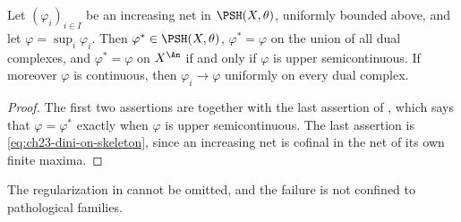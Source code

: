\begin{corollary}
\label{cor:ch23-increasing-net}
Let \((\varphi_i)_{i\in I}\) be an increasing net in \(\PSH(X,\theta)\),
uniformly bounded above, and let \(\varphi=\sup_i\varphi_i\).  Then
\(\varphi^*\in\PSH(X,\theta)\), \(\varphi^*=\varphi\) on the union of all
dual complexes, and
\(\varphi^*=\varphi\) on \(X^{\An}\) if and only if \(\varphi\) is upper
semicontinuous.  If moreover \(\varphi\) is continuous, then
\(\varphi_i\to\varphi\) uniformly on every dual complex.
\end{corollary}

\begin{proof}
The first two assertions are  together with
the last assertion of , which says that
\(\varphi=\varphi^*\) exactly when \(\varphi\) is upper semicontinuous.  The
last assertion is \eqref{eq:ch23-dini-on-skeleton}, since an increasing net
is cofinal in the net of its own finite maxima.
\end{proof}

The regularization in  cannot be omitted, and
the failure is not confined to pathological families.

